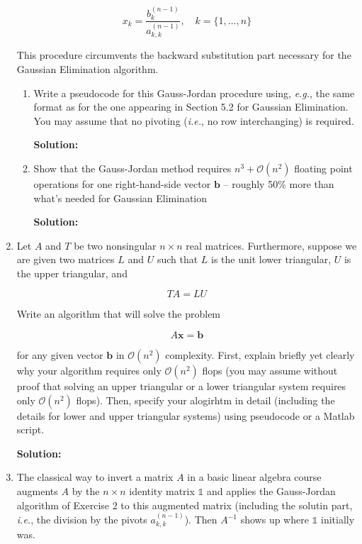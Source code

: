 \documentclass[12pt]{article}
\newcommand{\BigO}[1]{\mathcal{O}\left( #1 \right)}
\newcommand{\Id}{\mathbb{1}}
\begin{document}
\begin{enumerate}
\[
x_{k} = \frac{b_{k}^{(n-1)}}{a_{k,k}^{(n-1)}},\quad k = \{ 1, \ldots, n\}
\]

This procedure circumvents the backward substitution part necessary for the Gaussian Elimination algorithm.

\begin{enumerate}
\item Write a pseudocode for this Gauss-Jordan procedure using, {\em e.g.}, the same format
as for the one appearing in Section 5.2 for Gaussian Elimination. You may assume that no
pivoting ({\em i.e.}, no row interchanging) is required.

{\bf Solution:}

\item Show that the Gauss-Jordan method requires $n^{3} + \BigO{n^{2}}$ floating point operations
for one right-hand-side vector $\mathbf{b}$ -- roughly 50\% more than what's needed for Gaussian Elimination

{\bf Solution:}


\end{enumerate}

\item Let $A$ and $T$ be two nonsingular $n \times n$ real matrices. Furthermore, suppose we are given
two matrices $L$ and $U$ such that $L$ is the unit lower triangular, $U$ is the upper triangular, and

\[
TA = LU
\]

Write an algorithm that will solve the problem

\[
A\mathbf{x} = \mathbf{b}
\]

for any given vector $\mathbf{b}$ in $\BigO{n^{2}}$ complexity. First, explain briefly yet clearly
why your algorithm requires only $\BigO{n^{2}}$ flops (you may assume without proof that solving an upper triangular
or a lower triangular system requires only $\BigO{n^{2}}$ flops). Then, specify your alogirhtm in detail
(including the details for lower and upper triangular systems) using pseudocode or a {\sc Matlab} script.

{\bf Solution:}


\item The classical way to invert a matrix $A$ in a basic linear algebra course augments $A$ by the $n\times n$
identity matrix $\Id$ and applies the Gauss-Jordan algorithm of Exercise 2 to this augmented matrix
(including the solutin part, {\em i.e.}, the division by the pivots $a_{k,k}^{(n-1)}$). Then $A^{-1}$
shows up where $\Id$ initially was.


\end{enumerate}
\end{document}
